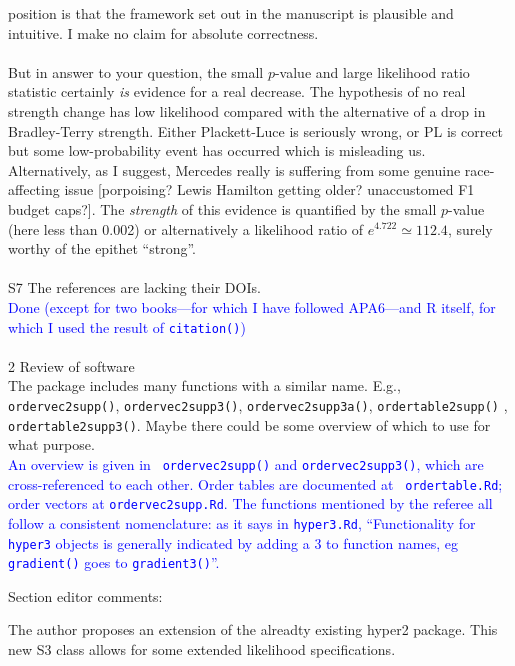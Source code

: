 \documentclass[12pt]{article}
\begin{document}
{  position is that the framework set out in the manuscript is
  plausible and intuitive.  I make no claim for absolute
  correctness.\\ \\ But in answer to your question, the small
  $p$-value and large likelihood ratio statistic certainly {\em is}
  evidence for a real decrease.  The hypothesis of no real strength
  change has low likelihood compared with the alternative of a drop in
  Bradley-Terry strength.  Either Plackett-Luce is seriously wrong, or
  PL is correct but some low-probability event has occurred which is
  misleading us.  Alternatively, as I suggest, Mercedes really is
  suffering from some genuine race-affecting issue [porpoising? Lewis
    Hamilton getting older?  unaccustomed F1 budget caps?].  The {\em
    strength} of this evidence is quantified by the small $p$-value
  (here less than 0.002) or alternatively a likelihood ratio of
  $e^{4.722}\simeq 112.4$, surely worthy of the epithet
  ``strong''.}\\ \\

S7 The references are lacking their DOIs.\\ \textcolor{blue}{Done
  (except for two books---for which I have followed APA6---and R
  itself, for which I used the result of {\tt citation()})} \\ \\

2 Review of software\\

The package includes many functions with a similar name. E.g., {\tt
  ordervec2supp()}, {\tt ordervec2supp3()}, {\tt ordervec2supp3a()},
{\tt ordertable2supp()} , {\tt ordertable2supp3()}. Maybe there could
be some overview of which to use for what
purpose.\\ \textcolor{blue}{An overview is given in {\tt
    ordervec2supp()} and {\tt ordervec2supp3()}, which are
  cross-referenced to each other.  Order tables are documented at {\tt
    ordertable.Rd}; order vectors at {\tt ordervec2supp.Rd}.  The
  functions mentioned by the referee all follow a consistent
  nomenclature: as it says in {\tt hyper3.Rd}, ``Functionality for
  {\tt hyper3} objects is generally indicated by adding a 3 to
  function names, eg {\tt gradient()} goes to {\tt gradient3()}''.}


Section editor comments:

The author proposes an extension of the alreadty existing hyper2 package.
This new S3 class allows for some extended likelihood specifications.
\end{document}
